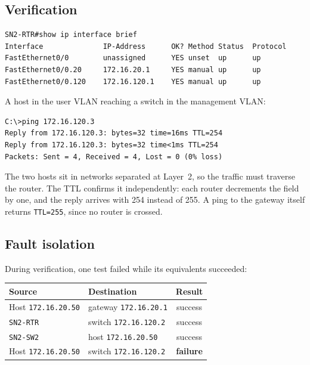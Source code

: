 \documentclass[12pt,a4paper]{article}
\begin{document}
\subsection{Verification}

\begin{lstlisting}
SN2-RTR#show ip interface brief
Interface              IP-Address      OK? Method Status  Protocol
FastEthernet0/0        unassigned      YES unset  up      up
FastEthernet0/0.20     172.16.20.1     YES manual up      up
FastEthernet0/0.120    172.16.120.1    YES manual up      up
\end{lstlisting}

A host in the user VLAN reaching a switch in the management VLAN:

\begin{lstlisting}
C:\>ping 172.16.120.3
Reply from 172.16.120.3: bytes=32 time=16ms TTL=254
Reply from 172.16.120.3: bytes=32 time<1ms TTL=254
Packets: Sent = 4, Received = 4, Lost = 0 (0% loss)
\end{lstlisting}

The two hosts sit in networks separated at Layer~2, so the traffic must traverse
the router. The TTL confirms it independently: each router decrements the field
by one, and the reply arrives with 254 instead of 255. A ping to the gateway
itself returns \texttt{TTL=255}, since no router is crossed.

\subsection{Fault isolation}

During verification, one test failed while its equivalents succeeded:

\begin{table}[H]
\centering
\begin{tabular}{@{} l l c @{}}
\toprule
\textbf{Source} & \textbf{Destination} & \textbf{Result} \\
\midrule
Host \texttt{172.16.20.50} & gateway \texttt{172.16.20.1}  & success \\
\texttt{SN2-RTR}           & switch \texttt{172.16.120.2}  & success \\
\texttt{SN2-SW2}           & host \texttt{172.16.20.50}    & success \\
Host \texttt{172.16.20.50} & switch \texttt{172.16.120.2}  & \textbf{failure} \\
\bottomrule
\end{tabular}
\end{table}
\end{document}
